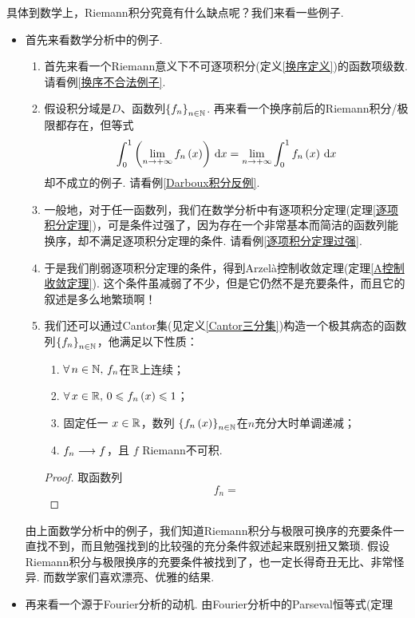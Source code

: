 具体到数学上，Riemann积分究竟有什么缺点呢？我们来看一些例子.
\begin{itemize}
    \item 首先来看数学分析中的例子.
          \begin{enumerate}
              \item 首先来看一个Riemann意义下不可逐项积分(定义\ref{换序定义})的函数项级数. 请看例\ref{换序不合法例子}.
              \item 假设积分域是$D$、函数列$\left\{f_n\right\}_{n\in\mathbb{N}}$. 再来看一个换序前后的Riemann积分/极限都存在，但等式
              \[   \int_0^1 \left( \lim_{n\to+\infty} f_n\left(x\right) \right) \,\mathrm{d} x  = \lim_{n\to+\infty} \int_0^1 f_n\left(x\right) \,\mathrm{d} x    \]
              却不成立的例子. 请看例\ref{Darboux积分反例}.
              \item 一般地，对于任一函数列，我们在数学分析中有逐项积分定理(定理\ref{逐项积分定理})，可是条件过强了，因为存在一个非常基本而简洁的函数列能换序，却不满足逐项积分定理的条件. 请看例\ref{逐项积分定理过强}.
              \item 于是我们削弱逐项积分定理的条件，得到Arzelà控制收敛定理(定理\ref{A控制收敛定理}). 这个条件虽减弱了不少，但是它仍然不是充要条件，而且它的叙述是多么地繁琐啊！
              \item 我们还可以通过Cantor集(见定义\ref{Cantor三分集})构造一个极其病态的函数列$\left\{ f_n \right\}_{n\in\mathbb{N}}$，他满足以下性质：
                    \begin{enumerate}
                        \item $\forall\,n\in\mathbb{N},\,f_n$在$\mathbb{R}$上连续；
                        \item $\forall\,x\in\mathbb{R},\,0\leqslant f_n\left(x\right)\leqslant 1$；
                        \item 固定任一 $x\in\mathbb{R}$，数列 $\left\{f_n\left(x\right)\right\}_{n\in\mathbb{N}}$在$n$充分大时单调递减；
                        \item $f_n\longrightarrow f$，且 $f$ Riemann不可积.
                    \end{enumerate}
                    \begin{proof}
                        取函数列
                        \[    f_n=      \]
                    \end{proof}
          \end{enumerate}
          由上面数学分析中的例子，我们知道Riemann积分与极限可换序的充要条件一直找不到，而且勉强找到的比较强的充分条件叙述起来既别扭又繁琐. 假设Riemann积分与极限换序的充要条件被找到了，也一定长得奇丑无比、非常怪异. 而数学家们喜欢漂亮、优雅的结果.
    \item 再来看一个源于Fourier分析的动机. 由Fourier分析中的Parseval恒等式(定理 

\end{itemize}

